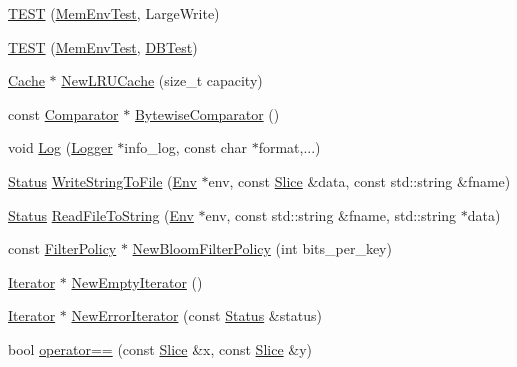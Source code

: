 \begin{DoxyCompactItemize}
\item 
\hyperlink{namespaceleveldb_a0af1e0377067cb2229d2ac1f66851040}{T\+E\+S\+T} (\hyperlink{classleveldb_1_1_mem_env_test}{Mem\+Env\+Test}, Large\+Write)
\item 
\hyperlink{namespaceleveldb_a2f341cbac955029d39ecb25107434a0c}{T\+E\+S\+T} (\hyperlink{classleveldb_1_1_mem_env_test}{Mem\+Env\+Test}, \hyperlink{classleveldb_1_1_d_b_test}{D\+B\+Test})
\item 
\hyperlink{classleveldb_1_1_cache}{Cache} $\ast$ \hyperlink{namespaceleveldb_a231e1b41322a8b342c91a15a78e425d4}{New\+L\+R\+U\+Cache} (size\+\_\+t capacity)
\item 
const \hyperlink{structleveldb_1_1_comparator}{Comparator} $\ast$ \hyperlink{namespaceleveldb_acd67740962c806afe8f4098cb153d25c}{Bytewise\+Comparator} ()
\item 
void \hyperlink{namespaceleveldb_aeba9623ceee38be99bed2bc1ae082954}{Log} (\hyperlink{classleveldb_1_1_logger}{Logger} $\ast$info\+\_\+log, const char $\ast$format,...)
\item 
\hyperlink{classleveldb_1_1_status}{Status} \hyperlink{namespaceleveldb_ae01563eb18a8527096b54d60251351cb}{Write\+String\+To\+File} (\hyperlink{classleveldb_1_1_env}{Env} $\ast$env, const \hyperlink{classleveldb_1_1_slice}{Slice} \&data, const std\+::string \&fname)
\item 
\hyperlink{classleveldb_1_1_status}{Status} \hyperlink{namespaceleveldb_aa47a20ae782e9ad537692c3202cd652d}{Read\+File\+To\+String} (\hyperlink{classleveldb_1_1_env}{Env} $\ast$env, const std\+::string \&fname, std\+::string $\ast$data)
\item 
const \hyperlink{classleveldb_1_1_filter_policy}{Filter\+Policy} $\ast$ \hyperlink{namespaceleveldb_ae6b34bf2331983721554f284b1eaa1a1}{New\+Bloom\+Filter\+Policy} (int bits\+\_\+per\+\_\+key)
\item 
\hyperlink{classleveldb_1_1_iterator}{Iterator} $\ast$ \hyperlink{namespaceleveldb_a3293c30e4a309a7293598b1db0f3e687}{New\+Empty\+Iterator} ()
\item 
\hyperlink{classleveldb_1_1_iterator}{Iterator} $\ast$ \hyperlink{namespaceleveldb_ab2c425a5fcb13b97e50e32c7b93186f5}{New\+Error\+Iterator} (const \hyperlink{classleveldb_1_1_status}{Status} \&status)
\item 
bool \hyperlink{namespaceleveldb_a53c443def2386ea299281cf36de3ae4b}{operator==} (const \hyperlink{classleveldb_1_1_slice}{Slice} \&x, const \hyperlink{classleveldb_1_1_slice}{Slice} \&y)
\item 

\end{DoxyCompactItemize}
